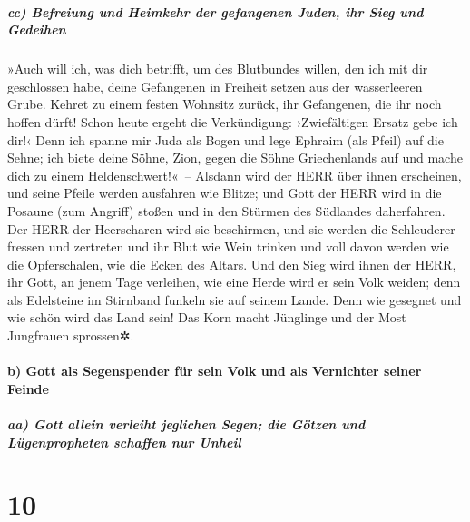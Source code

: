 \hypertarget{cc-befreiung-und-heimkehr-der-gefangenen-juden-ihr-sieg-und-gedeihen}{%
\subparagraph{cc) Befreiung und Heimkehr der gefangenen Juden, ihr Sieg
und
Gedeihen}\label{cc-befreiung-und-heimkehr-der-gefangenen-juden-ihr-sieg-und-gedeihen}}

 »Auch will ich, was dich betrifft, um des Blutbundes
willen, den ich mit dir geschlossen habe, deine Gefangenen in Freiheit
setzen aus der wasserleeren Grube.  Kehret zu einem
festen Wohnsitz zurück, ihr Gefangenen, die ihr noch hoffen dürft! Schon
heute ergeht die Verkündigung: ›Zwiefältigen Ersatz gebe ich dir!‹
 Denn ich spanne mir Juda als Bogen und lege Ephraim (als
Pfeil) auf die Sehne; ich biete deine Söhne, Zion, gegen die Söhne
Griechenlands auf und mache dich zu einem Heldenschwert!«~--
 Alsdann wird der HERR über ihnen erscheinen, und seine
Pfeile werden ausfahren wie Blitze; und Gott der HERR wird in die
Posaune (zum Angriff) stoßen und in den Stürmen des Südlandes
daherfahren.  Der HERR der Heerscharen wird sie
beschirmen, und sie werden die Schleuderer fressen und zertreten und ihr
Blut wie Wein trinken und voll davon werden wie die Opferschalen, wie
die Ecken des Altars.  Und den Sieg wird ihnen der HERR,
ihr Gott, an jenem Tage verleihen, wie eine Herde wird er sein Volk
weiden; denn als Edelsteine im Stirnband funkeln sie auf seinem Lande.
 Denn wie gesegnet und wie schön wird das Land sein! Das
Korn macht Jünglinge und der Most Jungfrauen sprossen✲.

\hypertarget{b-gott-als-segenspender-fuxfcr-sein-volk-und-als-vernichter-seiner-feinde}{%
\paragraph{b) Gott als Segenspender für sein Volk und als Vernichter
seiner
Feinde}\label{b-gott-als-segenspender-fuxfcr-sein-volk-und-als-vernichter-seiner-feinde}}

\hypertarget{aa-gott-allein-verleiht-jeglichen-segen-die-guxf6tzen-und-luxfcgenpropheten-schaffen-nur-unheil}{%
\subparagraph{aa) Gott allein verleiht jeglichen Segen; die Götzen und
Lügenpropheten schaffen nur
Unheil}\label{aa-gott-allein-verleiht-jeglichen-segen-die-guxf6tzen-und-luxfcgenpropheten-schaffen-nur-unheil}}

\hypertarget{section-9}{%
\section{10}\label{section-9}}

